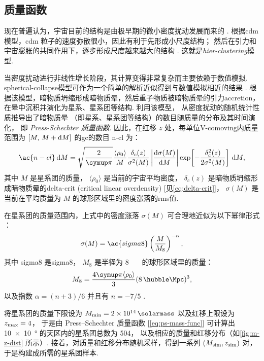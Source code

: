 \subsection{质量函数}
\label{sec:mass-function}

现在普遍认为，宇宙目前的结构是由极早期的微小密度扰动发展而来的 \cite{peebles1980}.
根据\acf{cdm} 模型，\ac{cdm} 粒子的速度弥散很小，因此有利于先形成小尺度结构；
然后在引力和宇宙膨胀的共同作用下，逐步形成尺度越来越大的结构
\cite{davis1985,bond1991,lacey1993}.
这就是\emph{\acf{hier-clustering}}模型.

当密度扰动进行非线性增长阶段，其计算变得非常复杂而主要依赖于数值模拟.
\ac{spherical-collapse}模型可作为一个简单的解析近似得到与数值模拟相近的结果
\cite{gunn1972}.
根据该模型，暗物质坍缩形成暗物质晕，然后重子物质被暗物质晕的引力\ac{accretion}，
在晕中沉积并演化为星系、星系团等结构.
利用该模型， 从密度扰动的随机统计性质推导出了暗物质晕
（即星系、星系团等结构）的数目随质量的分布及其时间演化，
即 \emph{Press-Schechter 质量函数}.
因此，在红移 $z$ 处，每单位\ac{V-comoving}内质量范围为 $[M,\, M+\mathrm{d}M]$
的\ac{gc}的数目 \ac{n-cl} 为：
\begin{equation}
  \label{eq:ps-mass-func}
  \ac{n-cl} \,\D{M} =
    \sqrt{\frac{2}{\Cpi}} \frac{\langle \rho_0 \rangle}{M}
    \frac{\delta_c(z)}{\sigma^2(M)} \left| \diff{\sigma(M)}{M} \right|
    \exp\!\left[ -\frac{\delta_c^2(z)}{2\sigma^2(M)} \right] \,\D{M} ,
\end{equation}
其中
$M$ 是星系团的质量，
$\langle \rho_0 \rangle$ 是当前的宇宙平均密度，
$\delta_c(z)$ 是暗物质坍缩形成暗物质晕的\acl{delta-crit}
(critical linear overdensity) [见\autoref{eq:delta-crit}]，
$\sigma(M)$ 是当前在平均质量为 $M$ 的球形区域里的密度涨落的\ac{rms}值.

在星系团的质量范围内，上式中的密度涨落 $\sigma(M)$ 可合理地近似为以下幂律形式
\cite{sarazin2002,randall2002}：
\begin{equation}
  \label{eq:sigma-mass}
  \sigma(M) = \ac{sigma8} \left( \frac{M}{M_8} \right)^{-\alpha} ,
\end{equation}
其中
\ac{sigma8} 是\acl{sigma8}，
$M_8$ 是半径为 \SI{8}{\per\hubble\Mpc} 的球形区域里的质量：
\begin{equation}
  M_8 = \frac{4\Cpi \langle \rho_0 \rangle}{3}
    (\SI{8}{\per\hubble\Mpc})^3 ,
\end{equation}
以及指数 $\alpha = (n+3)/6$ 并且有 $n = -7/5$ \cite{bahcall1998}.

将星系团的质量下限设为 $M_{\R{min}} = \SI{2e14}{\solarmass}$
以及红移上限设为 $z_{\mathrm{max}} = 4$，
于是由 Press--Schechter 质量函数 [\autoref{eq:ps-mass-func}]
可计算出 \SI{10 x 10}{\degree} 的天区内的星系团总数为 504，
以及相应的质量和红移分布（如\autoref{fig:m-z-dist} 所示）.
接着，对质量和红移分布随机采样，得到一系列 $(M_{\mathrm{sim}}, z_{\mathrm{sim}})$ 对，
于是构建成所需的星系团样本.

